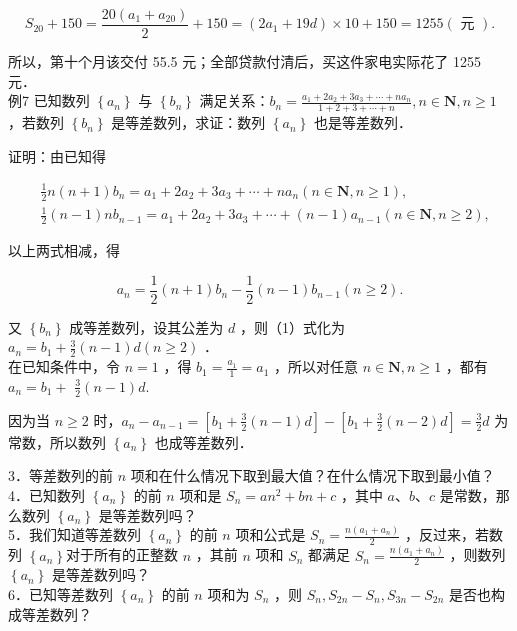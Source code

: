 \documentclass[10pt]{article}
\begin{document}
\[
S_{20}+150=\frac{20\left(a_{1}+a_{20}\right)}{2}+150=\left(2 a_{1}+19 d\right) \times 10+150=1255(\text { 元 }) .
\]

所以，第十个月该交付 55.5 元；全部贷款付清后，买这件家电实际花了 1255 元．\\
例7 已知数列 \(\left\{a_{n}\right\}\) 与 \(\left\{b_{n}\right\}\) 满足关系：\(b_{n}=\frac{a_{1}+2 a_{2}+3 a_{3}+\cdots+n a_{n}}{1+2+3+\cdots+n}, n \in \mathbf{N}, n \geqslant 1\) ，若数列 \(\left\{b_{n}\right\}\) 是等差数列，求证：数列 \(\left\{a_{n}\right\}\) 也是等差数列．

证明：由已知得

\[
\begin{aligned}
& \frac{1}{2} n(n+1) b_{n}=a_{1}+2 a_{2}+3 a_{3}+\cdots+n a_{n}(n \in \mathbf{N}, n \geqslant 1), \\
& \frac{1}{2}(n-1) n b_{n-1}=a_{1}+2 a_{2}+3 a_{3}+\cdots+(n-1) a_{n-1}(n \in \mathbf{N}, n \geqslant 2),
\end{aligned}
\]

以上两式相减，得

\[
a_{n}=\frac{1}{2}(n+1) b_{n}-\frac{1}{2}(n-1) b_{n-1}(n \geqslant 2) .
\]

又 \(\left\{b_{n}\right\}\) 成等差数列，设其公差为 \(d\) ，则（1）式化为 \(a_{n}=b_{1}+\frac{3}{2}(n-1) d(n \geqslant 2)\) ．\\
在已知条件中，令 \(n=1\) ，得 \(b_{1}=\frac{a_{1}}{1}=a_{1}\) ，所以对任意 \(n \in \mathbf{N}, n \geqslant 1\) ，都有 \(a_{n}=b_{1}+\) \(\frac{3}{2}(n-1) d\).

因为当 \(n \geqslant 2\) 时，\(a_{n}-a_{n-1}=\left[b_{1}+\frac{3}{2}(n-1) d\right]-\left[b_{1}+\frac{3}{2}(n-2) d\right]=\frac{3}{2} d\) 为常数，所以数列 \(\left\{a_{n}\right\}\) 也成等差数列．

3．等差数列的前 \(n\) 项和在什么情况下取到最大值？在什么情况下取到最小值？\\
4．已知数列 \(\left\{a_{n}\right\}\) 的前 \(n\) 项和是 \(S_{n}=a n^{2}+b n+c\) ，其中 \(a 、 b 、 c\) 是常数，那么数列 \(\left\{a_{n}\right\}\) 是等差数列吗？\\
5．我们知道等差数列 \(\left\{a_{n}\right\}\) 的前 \(n\) 项和公式是 \(S_{n}=\frac{n\left(a_{1}+a_{n}\right)}{2}\) ，反过来，若数列 \(\left\{a_{n}\right\}\)对于所有的正整数 \(n\) ，其前 \(n\) 项和 \(S_{n}\) 都满足 \(S_{n}=\frac{n\left(a_{1}+a_{n}\right)}{2}\) ，则数列 \(\left\{a_{n}\right\}\) 是等差数列吗？\\
6．已知等差数列 \(\left\{a_{n}\right\}\) 的前 \(n\) 项和为 \(S_{n}\) ，则 \(S_{n}, S_{2 n}-S_{n}, S_{3 n}-S_{2 n}\) 是否也构成等差数列？
\end{document}
